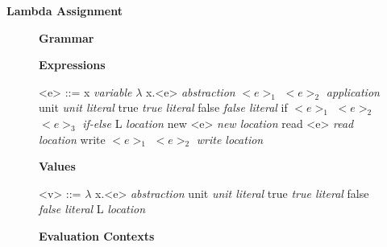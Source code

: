 \documentclass[11pt,oneside]{book}
\newcommand{\synlabel}[1]{\hfill \textit{#1}}
\begin{document}
\frontmatter

\mainmatter

\pagebreak

\begin{center}
    {
        \bf
        \huge
        Lambda Assignment
    }
\end{center}

\begin{figure}[!hp]
\begin{center}
{
    \bf
    \huge
    Grammar
}
\end{center}


\setlength{\grammarindent}{10em} %

\setlength{\grammarparsep}{5pt} %

\textbf{Expressions}

\begin{grammar}

    <e> ::=  x                            \synlabel{variable}
        \alt $\lambda$ x.<e>              \synlabel{abstraction}
        \alt $<e>_1$ $<e>_2$              \synlabel{application}
        \alt unit                         \synlabel{unit literal}
        \alt true                         \synlabel{true literal}
        \alt false                        \synlabel{false literal}
        \alt if $<e>_1$ $<e>_2$ $<e>_3$   \synlabel{if-else}
        \alt L                            \synlabel{location}
        \alt new <e>                      \synlabel{new location}
        \alt read <e>                     \synlabel{read location}
        \alt write $<e>_1$ $<e>_2$        \synlabel{write location}

\end{grammar}

\textbf{Values}

\begin{grammar}

    <v> ::=  $\lambda$ x.<e>            \synlabel{abstraction}
        \alt unit                       \synlabel{unit literal}
        \alt true                       \synlabel{true literal}
        \alt false                      \synlabel{false literal}
        \alt L                          \synlabel{location}

\end{grammar}

\textbf{Evaluation Contexts}


\end{figure}
\end{document}
